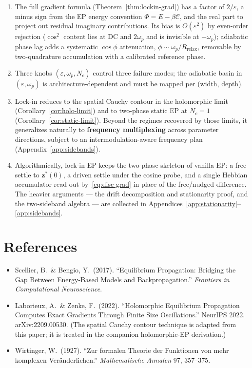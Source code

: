 \documentclass[11pt]{article}
\theoremstyle{definition}
\begin{document}
\begin{enumerate}
\item The full gradient formula (Theorem~\ref{thm:lockin-grad})
  has a factor of $2/\varepsilon$, a minus sign from the EP energy
  convention $\Phi = E - \beta\mathcal{C}$, and the real part to
  project out residual imaginary contributions.  Its bias is
  $O(\varepsilon^2)$ by even-order rejection ($\cos^2$ content lies
  at DC and $2\omega_p$ and is invisible at $+\omega_p$); adiabatic
  phase lag adds a systematic $\cos\phi$ attenuation,
  $\phi\sim\omega_p/R_\text{relax}$, removable by two-quadrature
  accumulation with a calibrated reference phase.

\item Three knobs $(\varepsilon, \omega_p, N_c)$ control three
  failure modes; the adiabatic basin in $(\varepsilon, \omega_p)$
  is architecture-dependent and must be mapped per (width, depth).

\item Lock-in reduces to the spatial Cauchy contour in the
  holomorphic limit (Corollary~\ref{cor:holo-limit}) and to
  two-phase static EP at $N_c = 1$
  (Corollary~\ref{cor:static-limit}).  Beyond the regimes
  recovered by those limits, it generalizes naturally to
  \textbf{frequency multiplexing} across parameter directions,
  subject to an intermodulation-aware frequency plan
  (Appendix~\ref{app:sidebands}).

\item Algorithmically, lock-in EP keeps the two-phase skeleton of
  vanilla EP: a free settle to $\bm{z}^*(0)$, a driven settle under the
  cosine probe, and a single Hebbian accumulator read out
  by~\eqref{eq:disc-grad} in place of the free/nudged difference.  The
  heavier arguments --- the drift decomposition and stationarity proof,
  and the two-sideband algebra --- are collected in
  Appendices~\ref{app:stationarity}--\ref{app:sidebands}.
\end{enumerate}

\section*{References}

\begin{itemize}
\item Scellier, B.\ \& Bengio, Y.\ (2017). ``Equilibrium
  Propagation: Bridging the Gap Between Energy-Based Models and
  Backpropagation.'' \emph{Frontiers in Computational Neuroscience}.
\item Laborieux, A.\ \& Zenke, F.\ (2022). ``Holomorphic Equilibrium
  Propagation Computes Exact Gradients Through Finite Size
  Oscillations.'' NeurIPS 2022. arXiv:2209.00530.  (The spatial
  Cauchy contour technique is adapted from this paper; it is treated in
  the companion holomorphic-EP derivation.)
\item Wirtinger, W.\ (1927). ``Zur formalen Theorie der Funktionen
  von mehr komplexen Veränderlichen.'' \emph{Mathematische Annalen}
  97, 357--375.
\end{itemize}
\end{document}
